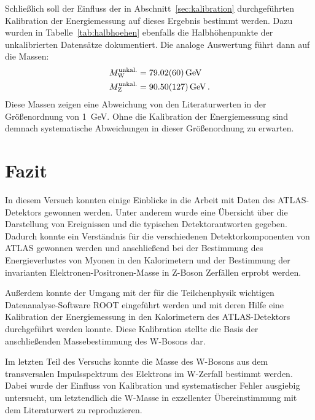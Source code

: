 \documentclass[11pt, a4paper]{article}
\numberwithin{equation}{section}
\begin{document}
Schließlich soll der Einfluss der in Abschnitt~\ref{sec:kalibration} durchgeführten Kalibration der Energiemessung auf dieses Ergebnis bestimmt werden.
Dazu wurden in Tabelle~\ref{tab:halbhoehen} ebenfalls die Halbhöhenpunkte der unkalibrierten Datensätze dokumentiert.
Die analoge Auswertung führt dann auf die Massen:
\begin{align*}
	M_\mathrm{W}^\mathrm{unkal.} &= \SI{79.02 +- 0.60}{\GeV} \\
	M_\mathrm{Z}^\mathrm{unkal.} &= \SI{90.50 +- 1.27}{\GeV} \, \text{.}
\end{align*}
Diese Massen zeigen eine Abweichung von den Literaturwerten in der Größenordnung von \SI{1}{\GeV}.
Ohne die Kalibration der Energiemessung sind demnach systematische Abweichungen in dieser Größenordnung zu erwarten.

\section{Fazit}
In diesem Versuch konnten einige Einblicke in die Arbeit mit Daten des ATLAS-Detektors gewonnen werden.
Unter anderem wurde eine Übersicht über die Darstellung von Ereignissen und die typischen Detektorantworten gegeben.
Dadurch konnte ein Verständnis für die verschiedenen Detektorkomponenten von ATLAS gewonnen werden und anschließend bei der Bestimmung des Energieverlustes von Myonen in den Kalorimetern und der Bestimmung der invarianten Elektronen-Positronen-Masse in Z-Boson Zerfällen erprobt werden.

Außerdem konnte der Umgang mit der für die Teilchenphysik wichtigen Daten\-analyse-Software ROOT eingeführt werden und mit deren Hilfe eine Kalibration der Energiemessung in den Kalorimetern des ATLAS-Detektors durchgeführt werden konnte.
Diese Kalibration stellte die Basis der anschließenden Massebestimmung des W-Bosons dar.

Im letzten Teil des Versuchs konnte die Masse des W-Bosons aus dem transversalen Impulsspektrum des Elektrons im W-Zerfall bestimmt werden.
Dabei wurde der Einfluss von Kalibration und systematischer Fehler ausgiebig untersucht, um letztendlich die W-Masse in exzellenter Übereinstimmung mit dem Literaturwert zu reproduzieren.
\end{document}
